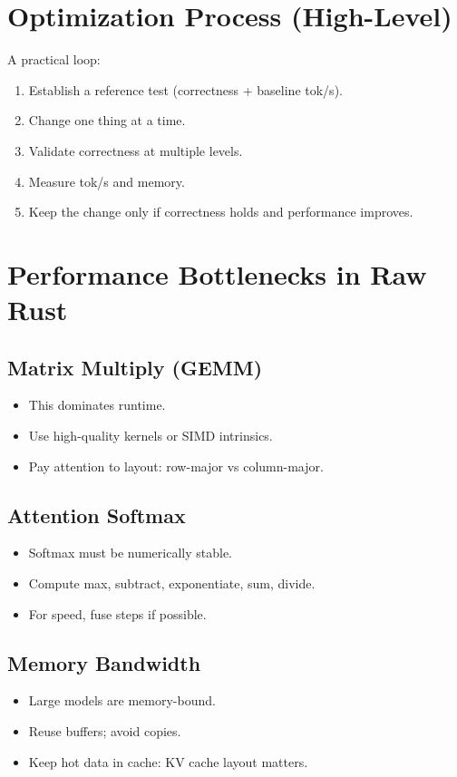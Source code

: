 \documentclass[11pt]{article}
\begin{document}
\section{Optimization Process (High-Level)}
A practical loop:
\begin{enumerate}
  \item Establish a reference test (correctness + baseline tok/s).
  \item Change one thing at a time.
  \item Validate correctness at multiple levels.
  \item Measure tok/s and memory.
  \item Keep the change only if correctness holds and performance improves.
\end{enumerate}

\section{Performance Bottlenecks in Raw Rust}
\subsection{Matrix Multiply (GEMM)}
\begin{itemize}
  \item This dominates runtime.
  \item Use high-quality kernels or SIMD intrinsics.
  \item Pay attention to layout: row-major vs column-major.
\end{itemize}

\subsection{Attention Softmax}
\begin{itemize}
  \item Softmax must be numerically stable.
  \item Compute max, subtract, exponentiate, sum, divide.
  \item For speed, fuse steps if possible.
\end{itemize}

\subsection{Memory Bandwidth}
\begin{itemize}
  \item Large models are memory-bound.
  \item Reuse buffers; avoid copies.
  \item Keep hot data in cache: KV cache layout matters.
\end{itemize}
\end{document}
